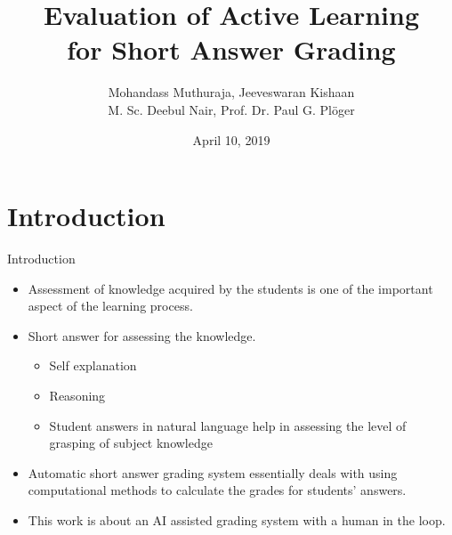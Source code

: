 \documentclass{beamer}
\title[]{Evaluation of Active Learning \\ for Short Answer Grading}
\author[Mohandass Muthuraja, Jeeveswaran Kishaan]{Mohandass Muthuraja, Jeeveswaran Kishaan \\ M. Sc. Deebul Nair, Prof. Dr. Paul G. Pl\"oger}
\date{April 10, 2019}
\institute[HBRS]{Hochschule Bonn-Rhein-Sieg}
\begin{document}
\begin{frame}
\titlepage
\end{frame}

\iftoggle{german}{
\begin{frame}{Agenda}
\usebeamerfont{ccc}
\tableofcontents
\end{frame}
}{
\begin{frame}{Table of Contents}
\usebeamerfont{ccc}
\tableofcontents
\end{frame}
}
\section{Introduction}
\begin{frame}{Introduction}
\begin{itemize}
	\item Assessment of knowledge acquired by the students is one of the important aspect of the learning process.
	\item Short answer for assessing the knowledge.
	\begin{itemize}
		\item  Self explanation 
		\item Reasoning
		\item Student answers in natural language help in assessing the level of grasping of subject knowledge
	\end{itemize}
	\item Automatic short answer grading system essentially deals with using computational methods to calculate the grades for students' answers.  
	\item This work is about an AI assisted grading system with a human in the loop.
\end{itemize}
\end{frame}
\end{document}
